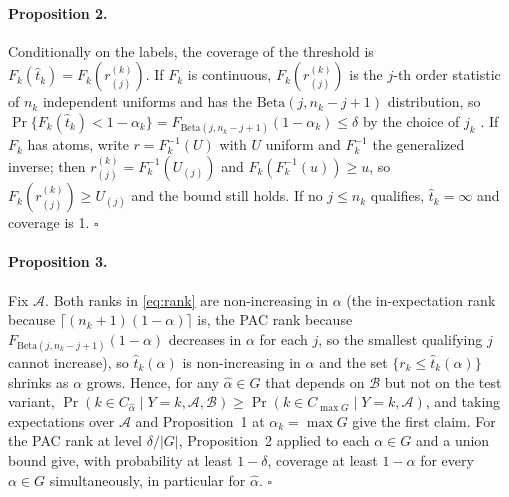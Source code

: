 \paragraph{Proposition 2.}
Conditionally on the labels, the coverage of the threshold is $F_k(\hat t_k)=F_k(r^{(k)}_{(j)})$. If $F_k$ is continuous,
$F_k(r^{(k)}_{(j)})$ is the $j$-th order statistic of $n_k$ independent uniforms and has the
$\mathrm{Beta}(j,n_k-j+1)$ distribution, so $\Pr\{F_k(\hat t_k)<1-\alpha_k\}=F_{\mathrm{Beta}(j,n_k-j+1)}(1-\alpha_k)\le\delta$
by the choice of $j_k$ \cite{Vovk2013}. If $F_k$ has atoms, write $r=F_k^{-1}(U)$ with $U$ uniform and
$F_k^{-1}$ the generalized inverse; then $r^{(k)}_{(j)}=F_k^{-1}(U_{(j)})$ and $F_k(F_k^{-1}(u))\ge u$, so
$F_k(r^{(k)}_{(j)})\ge U_{(j)}$ and the bound still holds. If no $j\le n_k$ qualifies, $\hat t_k=\infty$ and coverage
is 1. \hfill$\square$

\paragraph{Proposition 3.}
Fix $\mathcal A$. Both ranks in \eqref{eq:rank} are non-increasing in $\alpha$ (the in-expectation rank because
$\lceil (n_k+1)(1-\alpha)\rceil$ is, the PAC rank because $F_{\mathrm{Beta}(j,n_k-j+1)}(1-\alpha)$ decreases in $\alpha$
for each $j$, so the smallest qualifying $j$ cannot increase), so $\hat t_k(\alpha)$ is non-increasing in $\alpha$ and the set $\{r_k\le\hat t_k(\alpha)\}$ shrinks as
$\alpha$ grows. Hence, for any $\hat\alpha\in G$ that depends on $\mathcal B$ but not on the test variant,
$\Pr(k\in C_{\hat\alpha}\mid Y=k,\mathcal A,\mathcal B)\ge\Pr(k\in C_{\max G}\mid Y=k,\mathcal A)$, and taking
expectations over $\mathcal A$ and Proposition~1 at $\alpha_k=\max G$ give the first claim. For the PAC rank at level
$\delta/|G|$, Proposition~2 applied to each $\alpha\in G$ and a union bound give, with probability at least $1-\delta$,
coverage at least $1-\alpha$ for every $\alpha\in G$ simultaneously, in particular for $\hat\alpha$. \hfill$\square$

